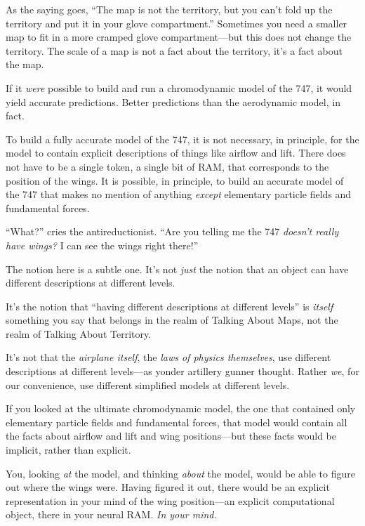 {
 As the saying goes, ``The map is not the
territory, but you can't fold up the territory and put
it in your glove compartment.'' Sometimes you need a
smaller map to fit in a more cramped glove compartment---but this does
not change the territory. The scale of a map is not a fact about the
territory, it's a fact about the map.}

{
 If it \textit{were} possible to build and run a chromodynamic
model of the 747, it would yield accurate predictions. Better
predictions than the aerodynamic model, in fact.}

{
 To build a fully accurate model of the 747, it is not necessary,
in principle, for the model to contain explicit descriptions of things
like airflow and lift. There does not have to be a single token, a
single bit of RAM, that corresponds to the position of the wings. It is
possible, in principle, to build an accurate model of the 747 that
makes no mention of anything \textit{except} elementary particle fields
and fundamental forces.}

{
 ``What?'' cries the
antireductionist. ``Are you telling me the 747
\textit{doesn't really have wings?} I can see the wings
right there!''}

{
 The notion here is a subtle one. It's not
\textit{just} the notion that an object can have different descriptions
at different levels.}

{
 It's the notion that ``having
different descriptions at different levels'' is
\textit{itself} something you say that belongs in the realm of Talking
About Maps, not the realm of Talking About Territory.}

{
 It's not that the \textit{airplane itself}, the
\textit{laws of physics themselves}, use different descriptions at
different levels---as yonder artillery gunner thought. Rather
\textit{we}, for our convenience, use different simplified models at
different levels.}

{
 If you looked at the ultimate chromodynamic model, the one that
contained only elementary particle fields and fundamental forces, that
model would contain all the facts about airflow and lift and wing
positions---but these facts would be implicit, rather than explicit.}

{
 You, looking \textit{at} the model, and thinking \textit{about}
the model, would be able to figure out where the wings were. Having
figured it out, there would be an explicit representation in your mind
of the wing position---an explicit computational object, there in your
neural RAM. \textit{In your mind.}}

